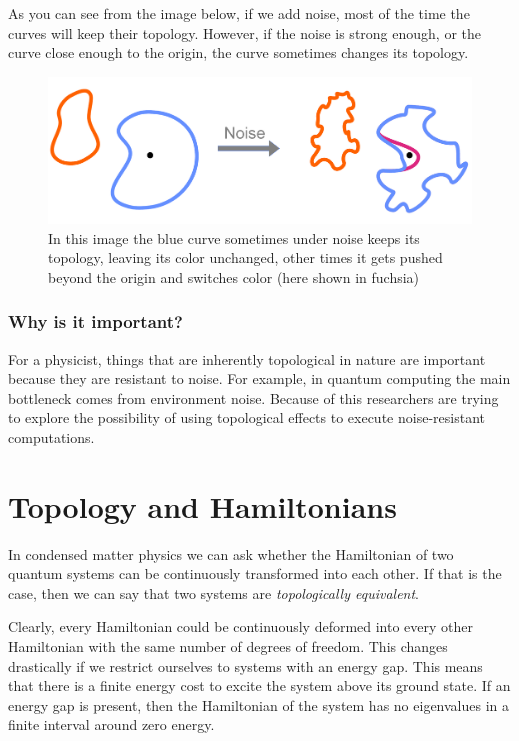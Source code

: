 As you can see from the image below, if we add noise, most of the time the curves will keep their topology. However, if the noise is strong enough, or the curve close enough to the origin, the curve sometimes changes its topology.
\begin{figure}[h]
    \includegraphics[width=\linewidth]{Immagini/topo/topo2.pdf}
    \caption{In this image the blue curve sometimes under noise keeps its topology, leaving its color unchanged, other times it gets pushed beyond the origin and switches color  (here shown in fuchsia)
    }
    \label{fig:topo2}
\end{figure}

\subsubsection*{Why is it important?}
For a physicist, things that are inherently topological in nature are important because they are resistant to noise. For example, in quantum computing the main bottleneck comes from environment noise. Because of this researchers are trying to explore the possibility of using topological effects to execute noise-resistant computations.




\section{Topology and Hamiltonians}
    In condensed matter physics we can ask whether the Hamiltonian of two quantum systems can be continuously transformed into each other. If that is the case, then we can say that two systems are \textit{topologically equivalent}.
    
    Clearly, every Hamiltonian could be continuously deformed into every other Hamiltonian with the same number of degrees of freedom. This changes drastically if we restrict ourselves to systems with an energy gap. This means that there is a finite energy cost to excite the system above its ground state. If an energy gap is present, then the Hamiltonian of the system has no eigenvalues in a finite interval around zero energy.


